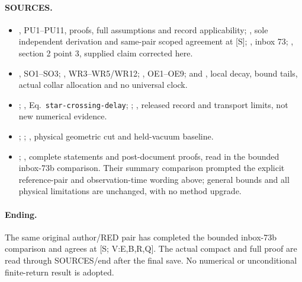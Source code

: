 \documentclass[11pt]{article}
\begin{document}
\paragraph{SOURCES.}
\begin{itemize}
\item {},
PU1--PU11, proofs, full assumptions and record applicability;
,
sole independent derivation and same-pair scoped agreement at [S];
, inbox 73;
,
section 2 point 3, supplied claim corrected here.
\item {},
SO1--SO3;
,
WR3--WR5/WR12;
,
OE1--OE9;
and ,
local decay, bound tails, actual collar allocation and no universal clock.
\item {};
,
Eq.~\texttt{star-crossing-delay};
;
,
released record and transport limits, not new numerical evidence.
\item {};
;
,
physical geometric cut and held-vacuum baseline.
\item {};
,
complete statements and post-document proofs, read in the bounded
inbox-73b comparison.  Their summary comparison prompted the explicit
reference-pair and observation-time wording above; general bounds and
all physical limitations are unchanged, with no method upgrade.
\end{itemize}

\paragraph{Ending.}
The same original author/RED pair has completed the bounded inbox-73b
comparison and agrees at [S; V:E,B,R,Q].  The actual compact and full proof are read
through SOURCES/end after the final save.  No numerical or unconditional
finite-return result is adopted.
\end{document}
